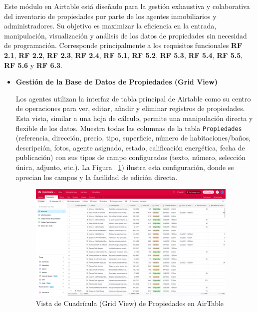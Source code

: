 \begin{enumerate}
    Este módulo en Airtable está diseñado para la gestión exhaustiva y colaborativa del inventario de propiedades por parte de los agentes inmobiliarios y administradores. Su objetivo es maximizar la eficiencia en la entrada, manipulación, visualización y análisis de los datos de propiedades sin necesidad de programación. Corresponde principalmente a los requisitos funcionales \textbf{RF 2.1}, \textbf{RF 2.2}, \textbf{RF 2.3}, \textbf{RF 2.4}, \textbf{RF 5.1}, \textbf{RF 5.2}, \textbf{RF 5.3}, \textbf{RF 5.4}, \textbf{RF 5.5}, \textbf{RF 5.6} y \textbf{RF 6.3}.

    \begin{itemize}
        \item \textbf{Gestión de la Base de Datos de Propiedades (Grid View)}

        Los agentes utilizan la interfaz de tabla principal de Airtable como su centro de operaciones para ver, editar, añadir y eliminar registros de propiedades. Esta vista, similar a una hoja de cálculo, permite una manipulación directa y flexible de los datos. Muestra todas las columnas de la tabla \texttt{Propiedades} (referencia, dirección, precio, tipo, superficie, número de habitaciones/baños, descripción, fotos, agente asignado, estado, calificación energética, fecha de publicación) con sus tipos de campo configurados (texto, número, selección única, adjunto, etc.). La Figura ~\ref{fig:gridviewpropiedadesairtable}) ilustra esta configuración, donde se aprecian los campos y la facilidad de edición directa.
    
        \begin{figure}[H]
            \begin{center}
                \includegraphics[width = 0.95\textwidth]{Figuras/gridviewpropiedadesairtable.png}
            \end{center}
            \caption{\label{fig:gridviewpropiedadesairtable} Vista de Cuadrícula (Grid View) de Propiedades en AirTable}
        \end{figure}
        

\end{itemize}
\end{enumerate}
